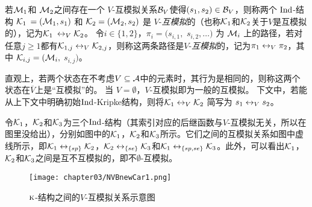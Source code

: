 若${\cal M}_1$和 ${\cal M}_2$之间存在一个 $V$-互模拟关系${\cal B}_V$使得$(s_1, s_2)\in {\cal B}_V$，则称两个 $\textrm{Ind}$-结构 ${\cal K}_1$ $= ({\cal M}_1, s_1)$ 和 ${\cal K}_2 = ({\cal M}_2, s_2)$ 是 $V$-{\em 互模拟}的（也称${\cal K}_1$和${\cal K}_2$关于$V$是互模拟的），记为${\cal K}_1$ $\leftrightarrow_V {\cal K}_2$。
令$i\in \{1,2\}$，$\pi_i=(s_{i,1},$ $s_{i,2},\ldots)$ 为 ${\cal M}_i$ 上的路径，若对任意$j \ge 1$都有$ {\cal K}_{1,j} \leftrightarrow_V {\cal K}_{2,j}$，则称这两条路径是$V$-{\em 互模拟}的，记为$\pi_1 \leftrightarrow_V \pi_2$，其中 ${\cal K}_{i,j}=({\cal M}_i,$ $s_{i,j})$。


直观上，若两个状态在不考虑$V\subseteq\cal A$中的元素时，其行为是相同的，则称这两个状态在$\overline{V}$上是“互模拟”的。
当 $V=\emptyset$，$V$-互模拟即为一般的互模拟。
下文中，若能从上下文中明确初始$\textrm{Ind}$-Kripke结构，则将${\cal K}_1 \leftrightarrow_V {\cal K}_2$ 简写为 $s_1 \leftrightarrow_V s_2$。

\begin{example}\label{exam:vB}
	令${\cal K}_1$，${\cal K}_2$和${\cal K}_3$为三个$\textrm{Ind}$-结构（其索引对应的后继函数与$V$-互模拟无关，所以在图里没给出），分别如图中的${\cal K}_1$，${\cal K}_2$和${\cal K}_3$所示。它们之间的互模拟关系如图中虚线所示，即${\cal K}_1 \leftrightarrow_{\{sp\}} {\cal K}_2$，${\cal K}_2 \leftrightarrow_{\{se\}} {\cal K}_3$和${\cal K}_1 \leftrightarrow_{\{sp,se\}} {\cal K}_3$。此外，可以看出${\cal K}_1$，${\cal K}_2$和${\cal K}_3$之间是互不互模拟\cite{Baier:PMC:2008}的，即不$\emptyset$-互模拟。
	\begin{figure*}[!htb]
		\centering
		\texttt{[image: chapter03/NVBnewCar1.png]}\\
		\caption{$\textsc{k}$-结构之间的$V$-互模拟关系示意图}
		\label{Fig:chapter04:v1uv2}
	\end{figure*}
\end{example}



